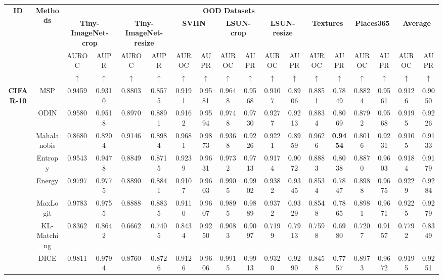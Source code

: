 \documentclass[letterpaper]{article} %
\begin{document}
\begin{table}[!ht]
\renewcommand\arraystretch{1.0}
\begin{adjustbox}{width=17.8cm,center}
\begin{tabular}{c|c|cccccccccccccc|cc} \toprule
\multirow{4}{*}{\textbf{ID}} & \multirow{4}{*}{\textbf{Methods}} & \multicolumn{14}{c}{\textbf{OOD Datasets}} \\
 &  & \multicolumn{2}{c}{\textbf{Tiny-ImageNet-crop}} & \multicolumn{2}{c}{\textbf{Tiny-ImageNet-resize}} & \multicolumn{2}{c}{\textbf{SVHN}} & \multicolumn{2}{c}{\textbf{LSUN-crop}} & \multicolumn{2}{c}{\textbf{LSUN-resize}} & \multicolumn{2}{c}{\textbf{Textures}} & \multicolumn{2}{c|}{\textbf{Places365}}& \multicolumn{2}{c}{\textbf{Average}} \\
 &  & AUROC & AUPR & AUROC & AUPR & AUROC & AUPR & AUROC & AUPR & AUROC & AUPR & AUROC & AUPR & AUROC & AUPR & AUROC & AUPR\\ 
 &  & $\uparrow$ & $\uparrow$ & $\uparrow$ & $\uparrow$ & $\uparrow$ & $\uparrow$ & $\uparrow$ & $\uparrow$ & $\uparrow$ & $\uparrow$ & $\uparrow$ & $\uparrow$ & $\uparrow$ & $\uparrow$ &$\uparrow$ & $\uparrow$\\ \midrule
\multirow{12}{*}{\textbf{CIFAR-10}} 
 & MSP & 0.9459	&0.9310	&0.8803	&0.8575	&0.9191	&0.9581	&0.9648	&0.9568	&0.9107	&0.8906	&0.8851	&0.7849	&0.8824	&0.9561&0.9126	&0.9050\\
 & ODIN  &0.9580	&0.9518	&0.8970	&0.8891	&0.9162	&0.9594	&0.9748	&0.9730	&0.9277	&0.9213	&0.8834	&0.8069&0.8792	&0.9568	&0.9195	&0.9226\\
 & Mahalanobis   &0.8680	&0.8204	&0.9146	&0.8984	&0.9681	&0.9873	&0.9368	&0.9226	&0.9221&0.8959 &0.9626&\textbf{0.9454}	&0.8016	&0.9231	&0.9105	&0.9133\\
 & Entropy &0.9543	&0.9478	&0.8849	&0.8715	&0.9239	&0.9631	&0.9732	&0.9713	&0.9174	&0.9072	&0.8883	&0.8038&0.8870	&0.9603	&0.9184	&0.9179\\
 & Energy  &0.9797	&0.9775	&0.8890	&0.8841	&0.9107	&0.9603	&0.9905	&0.9902	&0.9382	&0.9345	&0.8534	&0.7847&0.8988	&0.9675	&0.9229	&0.9284\\
 & MaxLogit  &0.9783	&0.9755	&0.8888	&0.8835	&0.9110	&0.9607	&0.9895	&0.9889	&0.9372	&0.9329	&0.8548	&0.7865	&0.8981	&0.9671	&0.9225	&0.9279\\
 & KL-Matching &0.8362	&0.8642	&0.6662	&0.7405	&0.8434	&0.9250	&0.9083	&0.9097	&0.7199	&0.7913	&0.7598	&0.6980	&0.7207	&0.9157	&0.7792	&0.8349\\
 & DICE &0.9811	&0.9794	&0.8760	&0.8726	&0.9126	&0.9606	&0.9915	&0.9913	&0.9320	&0.9290	&0.8458	&0.7757&0.8973	&0.9672	&0.9195	&0.9251\\

\end{tabular}
\end{adjustbox}
\end{table}
\end{document}
